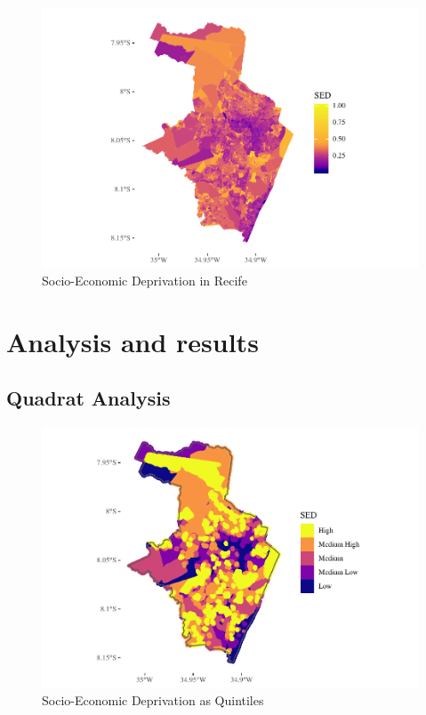 \documentclass[smallextended]{svjour3}       %
\begin{document}
\begin{figure}

\includegraphics{Moral_Communities_and_Crime_v1_files/figure-latex/plot-sed-1} \hfill{}

\caption{\label{fig:plot-sed}Socio-Economic Deprivation in Recife}\label{fig:plot-sed}
\end{figure}

\hypertarget{results}{%
\section{Analysis and results}\label{results}}

\hypertarget{quadrat-analysis-1}{%
\subsection{Quadrat Analysis}\label{quadrat-analysis-1}}

\begin{figure}
\centering
\includegraphics{Moral_Communities_and_Crime_v1_files/figure-latex/plot-sed-as-quintiles-1.pdf}
\caption{\label{fig:plot-sed-as-quintiles}Socio-Economic Deprivation as
Quintiles}
\end{figure}
\end{document}
